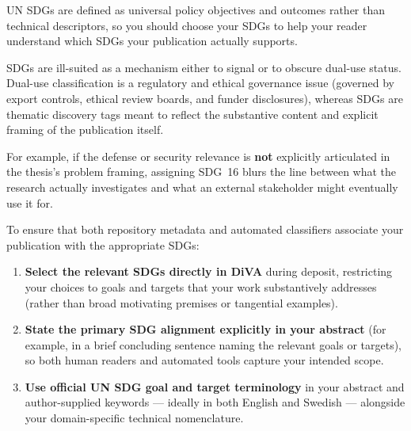 \begin{recommendation}
\label{rec:explicitScope}
UN \glspl{SDG} are defined as universal policy objectives and outcomes rather than technical descriptors, so you should choose your \glspl{SDG} to help your reader understand which \glspl{SDG} your publication actually supports.
\end{recommendation}

\begin{recommendation}
\label{rec:NotForSignalingDualUse}
\glspl{SDG} are ill-suited as a mechanism either to signal or to obscure dual-use status. Dual-use classification is a regulatory and ethical governance issue (governed by export controls, ethical review boards, and funder disclosures), whereas \glspl{SDG} are thematic discovery tags meant to reflect the substantive content and explicit framing of the publication itself.

For example, if the defense or security relevance is \textbf{not} explicitly articulated in the thesis's problem framing, assigning \gls{SDG}~16 blurs the line between what the research actually investigates and what an external stakeholder might eventually use it for.
\end{recommendation}

\begin{recommendation}
\label{rec:EnsureSpecificSDGs}
To ensure that both repository metadata and automated classifiers associate your publication with the appropriate \glspl{SDG}:
\begin{enumerate}
  \item \textbf{Select the relevant \glspl{SDG} directly in \gls{DiVA}} during deposit, restricting your choices to goals and targets that your work substantively addresses (rather than broad motivating premises or tangential examples).
  
  \item \textbf{State the primary \gls{SDG} alignment explicitly in your abstract} (for example, in a brief concluding sentence naming the relevant goals or targets), so both human readers and automated tools capture your intended scope.
  
  \item \textbf{Use official \gls{UN} \gls{SDG} goal and target terminology} in your abstract and author-supplied keywords --- ideally in both English and Swedish --- alongside your domain-specific technical nomenclature.
\end{enumerate}
\end{recommendation}

